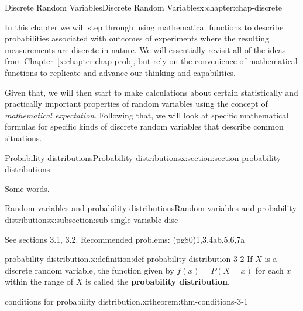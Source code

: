 \documentclass[oneside,10pt,]{book}
\newcommand{\xreffont}{\relax}
\newcommand{\terminology}[1]{\textbf{#1}}
\begin{document}
\begin{chapterptx}{Discrete Random Variables}{}{Discrete Random Variables}{}{}{x:chapter:chap-discrete}
\begin{introduction}{}%
In this chapter we will step through using mathematical functions to describe probabilities associated with outcomes of experiments where the resulting measurements are discrete in nature.  We will essentially revisit all of the ideas from \hyperref[x:chapter:chap-prob]{Chapter~{\xreffont\ref{x:chapter:chap-prob}}}, but rely on the convenience of mathematical functions to replicate and advance our thinking and capabilities.%
\par
Given that, we will then start to make calculations about certain statistically and practically important properties of random variables using the concept of \emph{mathematical expectation}.  Following that, we will look at specific mathematical formulas for specific kinds of discrete random variables that describe common situations.%
\end{introduction}%
%
%
\typeout{************************************************}
\typeout{************************************************}
%
\begin{sectionptx}{Probability distributions}{}{Probability distributions}{}{}{x:section:section-probability-distributions}
\begin{introduction}{}%
Some words.%
\end{introduction}%
%
%
\typeout{************************************************}
\typeout{************************************************}
%
\begin{subsectionptx}{Random variables and probability distributions}{}{Random variables and probability distributions}{}{}{x:subsection:sub-single-variable-disc}
\begin{introduction}{}%
See sections 3.1, 3.2. Recommended problems: (pg80)1,3,4ab,5,6,7a%
\end{introduction}%
\begin{definition}{probability distribution.}{x:definition:def-probability-distribution-3-2}%
If \(\displaystyle X\) is a discrete random variable, the function given by \(\displaystyle f(x) = P(X = x)\) for each \(\displaystyle
x\) within the range of \(\displaystyle X\) is called the \terminology{probability distribution}.%
\end{definition}
\begin{theorem}{conditions for probability distribution.}{}{x:theorem:thm-conditions-3-1}%

\end{theorem}
\end{subsectionptx}
\end{sectionptx}
\end{chapterptx}
\end{document}
